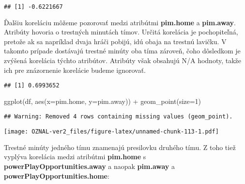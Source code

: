 \documentclass[
]{article}
\newenvironment{Shaded}{\begin{snugshade}}{\end{snugshade}}
\newcommand{\AttributeTok}[1]{\textcolor[rgb]{0.77,0.63,0.00}{#1}}
\newcommand{\DecValTok}[1]{\textcolor[rgb]{0.00,0.00,0.81}{#1}}
\newcommand{\FunctionTok}[1]{\textcolor[rgb]{0.00,0.00,0.00}{#1}}
\newcommand{\NormalTok}[1]{#1}
\newcommand{\SpecialCharTok}[1]{\textcolor[rgb]{0.00,0.00,0.00}{#1}}
\newcommand{\StringTok}[1]{\textcolor[rgb]{0.31,0.60,0.02}{#1}}
\begin{document}
\begin{Shaded}
\end{Shaded}

\begin{verbatim}
## [1] -0.6221667
\end{verbatim}

Ďalšiu koreláciu môžeme pozorovať medzi atribútmi \textbf{pim.home} a
\textbf{pim.away}. Atribúty hovoria o trestných minutách tímov. Určitá
korelácia je pochopiteľná, pretože ak sa napríklad dvaja hráči pobijú,
idú obaja na trestnú lavičku. V takomto prípade dostávajú trestné minúty
oba tíma zároveň, čoho dôsledkom je zvýšená korelácia týchto atribútov.
Atribúty však obsahujú N/A hodnoty, takže ich pre znázornenie korelácie
budeme ignorovať.

\begin{Shaded}
\end{Shaded}

\begin{verbatim}
## [1] 0.6993652
\end{verbatim}

\begin{Shaded}
\begin{Highlighting}[]
\FunctionTok{ggplot}\NormalTok{(df, }\FunctionTok{aes}\NormalTok{(}\AttributeTok{x=}\NormalTok{pim.home, }\AttributeTok{y=}\NormalTok{pim.away)) }\SpecialCharTok{+} \FunctionTok{geom\_point}\NormalTok{(}\AttributeTok{size=}\DecValTok{1}\NormalTok{)}
\end{Highlighting}
\end{Shaded}

\begin{verbatim}
## Warning: Removed 4 rows containing missing values (geom_point).
\end{verbatim}

\texttt{[image: OZNAL-ver2\_files/figure-latex/unnamed-chunk-113-1.pdf]}

Trestné minúty jedného tímu znamenajú presilovku druhého tímu. Z toho
tiež vyplýva korelácia medzi atribútmi \textbf{pim.home} s
\textbf{powerPlayOpportunities.away} a naopak \textbf{pim.away} a
\textbf{powerPlayOpportunities.home}:
\end{document}
